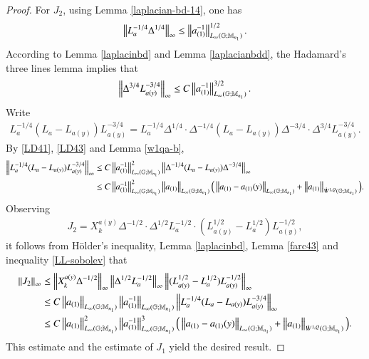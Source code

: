 \documentclass[leqno]{amsart}
\begin{document}
\begin{proof}
		For $J_{2}$, using Lemma \ref{laplacian-bd-14}, one has
		\begin{align}\label{LD41}
			\left\| L_{a}^{-1/4}\Delta^{1/4} \right\|_{\infty}\leq\left\| a_{(1)}^{-1} \right\|_{L_{\infty}(\mathbb{G};\mathbb{M}_{n_{1}})}^{1/2}.
		\end{align}
		According to Lemma \ref{laplacinbd} and Lemma \ref{laplacianbdd}, the Hadamard's three lines lemma \cite[Lemma 1.3.5]{G2014c} implies that
		\begin{align}\label{LD43}
			\left\| \Delta^{3/4}L_{a(y)}^{-3/4} \right\|_{\infty}
			\leq C\left\| a_{(1)}^{-1} \right\|_{L_{\infty}(\mathbb{G};\mathbb{M}_{n_{1}})}^{3/2}.
		\end{align}
		Write
		\begin{align*}
			L_{a}^{-1/4}(L_{a}-L_{a(y)})L_{a(y)}^{-3/4}
			=L_{a}^{-1/4}\Delta^{1/4}\cdot\Delta^{-1/4}(L_{a}-L_{a(y)})\Delta^{-3/4}
			\cdot\Delta^{3/4}L_{a(y)}^{-3/4}.
		\end{align*}
		By \eqref{LD41}, \eqref{LD43} and Lemma \ref{w1qa-b},
		\begin{align}\label{LL-sobolev}
			\nonumber\left\| L_{a}^{-1/4}(L_{a}-L_{a(y)})L_{a(y)}^{-3/4} \right\|_{\infty}
			&\leq 
			C\left\| a_{(1)}^{-1} \right\|_{L_{\infty}(\mathbb{G};\mathbb{M}_{n_{1}})}^{2}\left\| \Delta^{-1/4}(L_{a}-L_{a(y)})\Delta^{-3/4} \right\|_{\infty}\\
			&\leq C\left\| a_{(1)}^{-1} \right\|_{L_{\infty}(\mathbb{G};\mathbb{M}_{n_{1}})}^{2}\left\| a_{(1)} \right\|_{L_{\infty}(\mathbb{G};\mathbb{M}_{n_{1}})}
			\Big(\left\| a_{(1)}-a_{(1)}(y) \right\|_{L_{\infty}(\mathbb{G};\mathbb{M}_{n_{1}})}+\left\| a_{(1)} \right\|_{\dot{W}^{1,Q}(\mathbb{G};\mathbb{M}_{n_{1}})}\Big).
		\end{align}
		Observing
		\begin{align*}
			J_{2}=X_{k}^{a(y)}\Delta^{-1/2}\cdot \Delta^{1/2}L_{a}^{-1/2}
			\cdot (L_{a(y)}^{1/2}-L_{a}^{1/2})L_{a(y)}^{-1/2},
		\end{align*}
		it follows from H\"{o}lder's inequality, Lemma \ref{laplacinbd}, Lemma \ref{farc43}  and inequality \eqref{LL-sobolev} that
		\begin{align*}
			\left\| J_{2} \right\|_{\infty}
			&\leq\left\| X_{k}^{a(y)}\Delta^{-1/2} \right\|_{\infty}\left\| \Delta^{1/2}L_{a}^{-1/2} \right\|_{\infty}
			\left\| (L_{a(y)}^{1/2}-L_{a}^{1/2})L_{a(y)}^{-1/2} \right\|_{\infty}\\
			&\leq C
			\left\| a_{(1)} \right\|_{L_{\infty}(\mathbb{G};\mathbb{M}_{n_{1}})}\left\| a_{(1)}^{-1} \right\|_{L_{\infty}(\mathbb{G};\mathbb{M}_{n_{1}})}
			\left\| L_{a}^{-1/4}(L_{a}-L_{a(y)})L_{a(y)}^{-3/4} \right\|_{\infty}\\
			&\leq C\left\| a_{(1)} \right\|_{L_{\infty}(\mathbb{G};\mathbb{M}_{n_{1}})}^{2}\left\| a_{(1)}^{-1} \right\|_{L_{\infty}(\mathbb{G};\mathbb{M}_{n_{1}})}^{3}
			\Big(\left\| a_{(1)}-a_{(1)}(y) \right\|_{L_{\infty}(\mathbb{G};\mathbb{M}_{n_{1}})}+\left\| a_{(1)} \right\|_{\dot{W}^{1,Q}(\mathbb{G};\mathbb{M}_{n_{1}})}\Big).
		\end{align*}
		This estimate and the estimate of $J_{1}$ yield the desired result.
	\end{proof}
\end{document}

